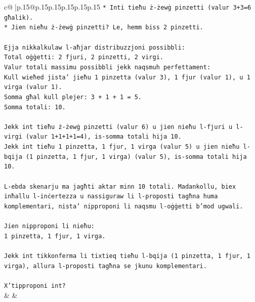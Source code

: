 \documentclass{article}
\begin{document}
{\begin{supertabular}{c@{$\;$}|p{.15\linewidth}@{}p{.15\linewidth}p{.15\linewidth}p{.15\linewidth}p{.15\linewidth}p{.15\linewidth}}
{{{\texttt{*   Inti tieħu ż{-}żewġ pinzetti (valur 3+3=6 għalik).} \\
\texttt{*   Jien nieħu ż{-}żewġ pinzetti? Le, hemm biss 2 pinzetti.} \\
\\ 
\texttt{Ejja nikkalkulaw l{-}aħjar distribuzzjoni possibbli:} \\
\texttt{Total oġġetti: 2 fjuri, 2 pinzetti, 2 virgi.} \\
\texttt{Valur totali massimu possibbli jekk naqsmuh perfettament:} \\
\texttt{Kull wieħed jista' jieħu 1 pinzetta (valur 3), 1 fjur (valur 1), u 1 virga (valur 1).} \\
\texttt{Somma għal kull plejer: 3 + 1 + 1 = 5.} \\
\texttt{Somma totali: 10.} \\
\\ 
\texttt{Jekk int tieħu ż{-}żewġ pinzetti (valur 6) u jien nieħu l{-}fjuri u l{-}virgi (valur 1+1+1+1=4), is{-}somma totali hija 10.} \\
\texttt{Jekk int tieħu 1 pinzetta, 1 fjur, 1 virga (valur 5) u jien nieħu l{-}bqija (1 pinzetta, 1 fjur, 1 virga) (valur 5), is{-}somma totali hija 10.} \\
\\ 
\texttt{L{-}ebda skenarju ma jagħti aktar minn 10 totali. Madankollu, biex inħallu l{-}inċertezza u nassiguraw li l{-}proposti tagħna huma komplementari, nista' nipproponi li naqsmu l{-}oġġetti b'mod ugwali.} \\
\\ 
\texttt{Jien nipproponi li nieħu:} \\
\texttt{1 pinzetta, 1 fjur, 1 virga.} \\
\\ 
\texttt{Jekk int tikkonferma li tixtieq tieħu l{-}bqija (1 pinzetta, 1 fjur, 1 virga), allura l{-}proposti tagħna se jkunu komplementari.} \\
\\ 
\texttt{X'tipproponi int?} \\
            }
        }
    }
    & & \\ \\


\end{supertabular}}
\end{document}
